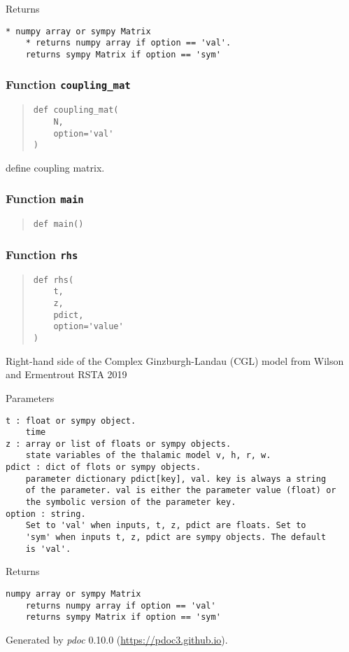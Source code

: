 \documentclass[english,a4paper,oneside]{article}
\begin{document}
Returns

\begin{verbatim}
* numpy array or sympy Matrix
    * returns numpy array if option == 'val'. 
    returns sympy Matrix if option == 'sym'
\end{verbatim}

\hypertarget{CGL.coupling_mat}{%
\subsubsection{\texorpdfstring{Function
\texttt{coupling\_mat}}{Function coupling\_mat}}\label{CGL.coupling_mat}}

\begin{quote}
\begin{verbatim}
def coupling_mat(
    N,
    option='val'
)
\end{verbatim}
\end{quote}

define coupling matrix.

\hypertarget{CGL.main}{%
\subsubsection{\texorpdfstring{Function
\texttt{main}}{Function main}}\label{CGL.main}}

\begin{quote}
\begin{verbatim}
def main()
\end{verbatim}
\end{quote}

\hypertarget{CGL.rhs}{%
\subsubsection{\texorpdfstring{Function
\texttt{rhs}}{Function rhs}}\label{CGL.rhs}}

\begin{quote}
\begin{verbatim}
def rhs(
    t,
    z,
    pdict,
    option='value'
)
\end{verbatim}
\end{quote}

Right-hand side of the Complex Ginzburgh-Landau (CGL) model from Wilson
and Ermentrout RSTA 2019

Parameters

\begin{verbatim}
t : float or sympy object.
    time
z : array or list of floats or sympy objects.
    state variables of the thalamic model v, h, r, w.
pdict : dict of flots or sympy objects.
    parameter dictionary pdict[key], val. key is always a string
    of the parameter. val is either the parameter value (float) or 
    the symbolic version of the parameter key.
option : string.
    Set to 'val' when inputs, t, z, pdict are floats. Set to
    'sym' when inputs t, z, pdict are sympy objects. The default
    is 'val'.
\end{verbatim}

Returns

\begin{verbatim}
numpy array or sympy Matrix
    returns numpy array if option == 'val'
    returns sympy Matrix if option == 'sym'
\end{verbatim}

Generated by \emph{pdoc} 0.10.0 (\url{https://pdoc3.github.io}).
\end{document}
